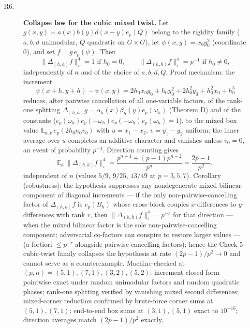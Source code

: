 \documentclass[11pt]{article}
\begin{document}
\begin{description}
\item[R6.] \textbf{Collapse law for the cubic mixed twist.} Let $g(x,y)=a(x)b(y)d(x-y)e_p(Q)$ belong to the rigidity family ($a,b,d$ unimodular, $Q$ quadratic on $G\times G$), let $\psi(x,y)=x_0y_0^2$ (coordinate $0$), and set $f=g\,e_p(\psi)$. Then $$\|\Delta_{(h,h)}f\|_\square^4=1 \text{ if } h_0=0, \qquad \|\Delta_{(h,h)}f\|_\square^4=p^{-1} \text{ if } h_0\neq 0,$$ independently of $n$ and of the choice of $a,b,d,Q$. Proof mechanism: the increment $$\psi(x+h,y+h)-\psi(x,y)=2h_0x_0y_0+h_0y_0^2+2h_0^2y_0+h_0^2x_0+h_0^3$$ reduces, after pairwise cancellation of all one-variable factors, of the rank-one splitting $\Delta_{(h,h)}g=\alpha_h(x)\beta_h(y)e_p(\omega_h)$ (Theorem D) and of the constants ($e_p(\omega_h)e_p(-\omega_h)e_p(-\omega_h)e_p(\omega_h)=1$), to the mixed box value $\mathbb{E}_{u,v}\,e_p(2h_0u_0v_0)$ with $u=x_1-x_2$, $v=y_1-y_2$ uniform; the inner average over $u$ completes an additive character and vanishes unless $v_0=0$, an event of probability $p^{-1}$. Direction counting gives $$\mathbb{E}_h\,\|\Delta_{(h,h)}f\|_\square^4=\frac{p^{n-1}+(p-1)p^{n-2}}{p^n}=\frac{2p-1}{p^2},$$ independent of $n$ (values $5/9$, $9/25$, $13/49$ at $p=3,5,7$). Corollary (robustness): the hypothesis suppresses any nondegenerate mixed-bilinear component of diagonal increments — if the only non-pairwise-cancelling factor of $\Delta_{(h,h)}f$ is $e_p(B_h)$ whose cross-block couples $x$-differences to $y$-differences with rank $r$, then $\|\Delta_{(h,h)}f\|_\square^4=p^{-r}$ for that direction — when the mixed bilinear factor is the sole non-pairwise-cancelling component; adversarial co-factors can conspire to restore larger values — (a fortiori $\le p^{-r}$ alongside pairwise-cancelling factors); hence the Check-5 cubic-twist family collapses the hypothesis at rate $(2p-1)/p^2\to0$ and cannot serve as a counterexample. Machine-checked at $(p,n)=(5,1),(7,1),(3,2),(5,2)$: increment closed form pointwise exact under random unimodular factors and random quadratic phases; rank-one splitting verified by vanishing mixed second differences; mixed-corner reduction confirmed by brute-force corner sums at $(5,1),(7,1)$; end-to-end box sums at $(3,1),(5,1)$ exact to $10^{-16}$; direction averages match $(2p-1)/p^2$ exactly.

\end{description}
\end{document}
